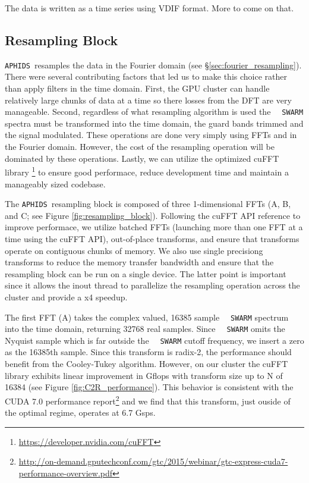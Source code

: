 \documentclass[11pt,preprint]{aastex}
\newcommand{\SWARM}[1]{\texttt{#1\,SWARM}}
\newcommand{\APHIDS}{\texttt{APHIDS}}
\begin{document}
The data is written as a time series using VDIF format.  More to come on that.

\subsection{Resampling Block}

\APHIDS\, resamples the data in the Fourier domain (see \S \ref{sec:fourier_resampling}).  There were several 
contributing factors that led us to make
this choice rather than apply filters in the time domain.  First, the GPU cluster can handle relatively large 
chunks of data at a time so there losses from the DFT are very manageable.  Second, regardless of 
what resampling algorithm is used the \SWARM\, spectra must 
be transformed into the time domain, the guard bands trimmed and the signal modulated.  These operations are done 
very simply using FFTs and in the Fourier domain.  However, the cost of the
resampling operation will be dominated by these operations.  Lastly, we can utilize the optimized cuFFT library
\footnote{\url{https://developer.nvidia.com/cuFFT}} to ensure good performace, reduce development time and 
maintain a manageably sized codebase.

The \APHIDS\, resampling block is composed of three 1-dimensional FFTs (A, B, and C; see Figure \ref{fig:resampling_block}).  
Following the cuFFT API reference to improve performace, we utilize batched
FFTs (launching more than one FFT at a time using the cuFFT API), out-of-place transforms, 
and ensure that transforms operate on contiguous chunks of memory.  We also use single precisiong transforms to 
reduce the memory transfer bandwidth and ensure that 
the resampling block can be run on a single device.  The latter point is important since it allows the inout
thread to parallelize the resampling operation across the cluster and provide a x4 speedup.

The first FFT (A) takes the complex valued, 16385 sample \SWARM\, 
spectrum into the time domain, returning 
32768 real samples.  Since \SWARM\, omits the Nyquist sample which is far outside the \SWARM\, cutoff frequency, 
we insert a zero as the 16385th sample.  Since this transform is radix-2, the performance should benefit from 
the Cooley-Tukey algorithm.  However, on our cluster the cuFFT library exhibits linear improvement in Gflops 
with transform size up to N of 16384 (see Figure \ref{fig:C2R_performance}).  This behavior is consistent with the CUDA 7.0 performance 
report\footnote{\url{http://on-demand.gputechconf.com/gtc/2015/webinar/gtc-express-cuda7-performance-overview.pdf}} 
and we find that this transform, just ouside of the optimal regime, operates at 6.7 Gsps.
\end{document}
